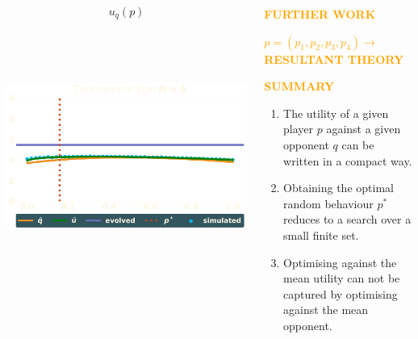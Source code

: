 \documentclass[usenames,dvipsnames,t]{beamer}
\begin{document}
\begin{columns}
\begin{column}{.7\linewidth}
\begin{columns}
\begin{column}{.5\linewidth}
\begin{center}
                \textbf{\[u_q(p)\]} \\
                 \\
                 \\
                 \\
                \includegraphics[width=.5\textwidth]{static/tournament}

            \end{center}
        \end{column}
    \end{columns}
    \end{column}
    \begin{column}{.25\linewidth}
        \begin{center}
            \vspace{-.08cm}
            \textcolor{orange}{\textbf{\Large{FURTHER WORK}}}
        \end{center}

        \begin{center}
            \vspace{.3cm}

            \textcolor{orange}{\small{\textbf{ \boldmath\(p=(p_1, p_2, p_3, p_4) \rightarrow\) RESULTANT THEORY}}}
        \end{center}
    \begin{center}
        
    \end{center}
            \vspace{2cm}

            \begin{center}
                \textcolor{orange}{\textbf{\Large{SUMMARY}}}
            \begin{center}
                \begin{enumerate}
                    \item The utility of a given player \(p\) against a given opponent \(q\) 
                    can be written in a compact way.
                    \item Obtaining the optimal random behaviour \(p ^ *\) reduces to a search over a small finite set.
                    \item Optimising against the mean utility can not be captured by optimising against the mean opponent.
                \end{enumerate}
            \end{center}
        \end{center}
    \end{column}
\end{columns}
\end{document}
